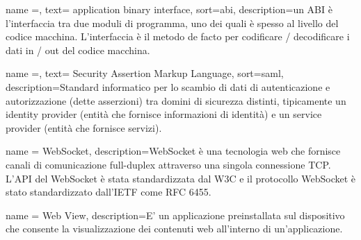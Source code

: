 {
    name =,
    text= application binary interface,
    sort=abi,
    description={un ABI è l'interfaccia tra due moduli di programma, uno dei quali è spesso al livello del codice macchina. L'interfaccia è il metodo de facto per codificare / decodificare i dati in / out del codice macchina.}
}

{
    name =,
    text= Security Assertion Markup Language,
    sort=saml,
    description={Standard informatico per lo scambio di dati di autenticazione e autorizzazione
    (dette asserzioni) tra domini di sicurezza distinti, tipicamente un identity provider
    (entità che fornisce informazioni di identità) e un service provider (entità che
    fornisce servizi).}
}


{
    name = {WebSocket},
    description={WebSocket è una tecnologia web che fornisce canali di comunicazione full-duplex attraverso una singola connessione TCP. L'API del WebSocket è stata standardizzata dal W3C e il protocollo WebSocket è stato standardizzato dall'IETF come RFC 6455.}
}

{
    name = {Web View},
    description={E' un applicazione preinstallata sul dispositivo che consente la visualizzazione dei contenuti web all'interno di un'applicazione.}
}
